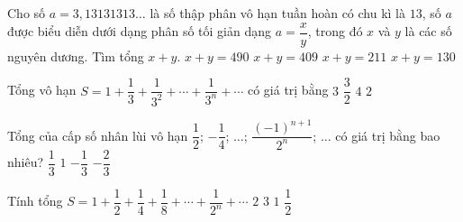 

\begin{ex}%
	 Cho số $a=3{,}13131313\ldots $ là số thập phân vô hạn tuần hoàn có chu kì là $13$, số $a$ được biểu diễn dưới dạng phân số tối giản dạng $a=\dfrac{x}{y}$, trong đó $x$ và $y$ là các số nguyên dương. Tìm tổng $x+y$.
	 \choice
		{\True  $x+y=490$}
		{$x+y=409$} 
		{$x+y=211$} 
		 {$x+y=130$}
\end{ex}

\begin{ex}%
	Tổng vô hạn $S=1+\dfrac{1}{3}+\dfrac{1}{3^2}+\cdots+\dfrac{1}{3^n}+\cdots$ có giá trị  bằng
	 \choice
		{$3$} 
		{\True $\dfrac{3}{2}$} 
		{$4$} 
		 {$2$}
\end{ex}

\begin{ex}%
	Tổng của cấp số nhân lùi vô hạn $\dfrac{1}{2}$; $-\dfrac{1}{4}$; $\ldots $; $\dfrac{(-1)^{n+1}}{2^{n}}$; $\ldots$  có giá trị bằng bao nhiêu?
	 \choice
		{\True  $\dfrac{1}{3}$}
		 {$1$}
		 {$-\dfrac{1}{3}$}
		{$-\dfrac{2}{3}$} 
\end{ex}

\begin{ex}%
	Tính  tổng $S=1+\dfrac{1}{2}+\dfrac{1}{4}+\dfrac{1}{8}+\cdots +\dfrac{1}{2^{n}}+\cdots$
	\choice 
		{\True $2$} 
		{$3$} 
		 {$1$}
		{$\dfrac{1}{2}$} 
\end{ex}

